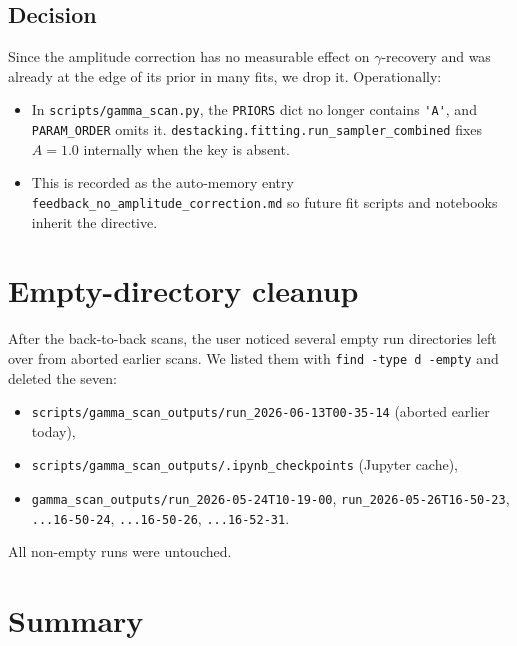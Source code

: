 \documentclass[11pt,a4paper]{article}
\begin{document}
\subsection{Decision}

Since the amplitude correction has no measurable effect on
$\gamma$-recovery and was already at the edge of its prior in many
fits, we drop it. Operationally:
\begin{itemize}
\item In \verb|scripts/gamma_scan.py|, the \verb|PRIORS| dict no
      longer contains \verb|'A'|, and \verb|PARAM_ORDER| omits it.
      \verb|destacking.fitting.run_sampler_combined| fixes
      $A = 1.0$ internally when the key is absent.
\item This is recorded as the auto-memory entry
      \verb|feedback_no_amplitude_correction.md| so future fit scripts
      and notebooks inherit the directive.
\end{itemize}


\section{Empty-directory cleanup}

After the back-to-back scans, the user noticed several empty run
directories left over from aborted earlier scans. We listed them with
\verb|find -type d -empty| and deleted the seven:
\begin{itemize}
\item \verb|scripts/gamma_scan_outputs/run_2026-06-13T00-35-14|
      (aborted earlier today),
\item \verb|scripts/gamma_scan_outputs/.ipynb_checkpoints|
      (Jupyter cache),
\item \verb|gamma_scan_outputs/run_2026-05-24T10-19-00|,
      \verb|run_2026-05-26T16-50-23|, \verb|...16-50-24|,
      \verb|...16-50-26|, \verb|...16-52-31|.
\end{itemize}
All non-empty runs were untouched.


\section{Summary}
\end{document}
